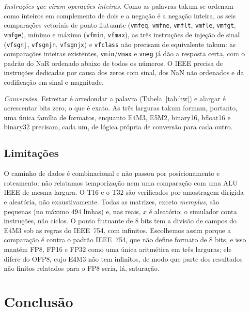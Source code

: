 \documentclass[conference]{IEEEtran}
\newcommand{\code}[1]{\texttt{#1}}
\begin{document}
\emph{Instruções que viram operações inteiras.} Como as palavras takum se ordenam como inteiros em
complemento de dois e a negação é a negação inteira, as seis comparações vetoriais de ponto flutuante
(\code{vmfeq}, \code{vmfne}, \code{vmflt}, \code{vmfle}, \code{vmfgt}, \code{vmfge}), mínimo e máximo
(\code{vfmin}, \code{vfmax}), as três instruções de injeção de sinal (\code{vfsgnj}, \code{vfsgnjn},
\code{vfsgnjx}) e \code{vfclass} não precisam de equivalente takum: as comparações inteiras existentes,
\code{vmin}/\code{vmax} e \code{vneg} já dão a resposta certa, com o padrão do NaR ordenado abaixo de
todos os números. O IEEE precisa de instruções dedicadas por causa dos zeros com sinal, dos NaN não
ordenados e da codificação em sinal e magnitude.

\emph{Conversões.} Estreitar é arredondar a palavra (Tabela~\ref{tab:hw}) e alargar é acrescentar bits
zero, o que é exato. As três larguras takum formam, portanto, uma única família de formatos, enquanto
E4M3, E5M2, binary16, bfloat16 e binary32 precisam, cada um, de lógica própria de conversão para cada
outro.

\subsection{Limitações}

O caminho de dados é combinacional e não passou por posicionamento e roteamento; não relatamos
temporização nem uma comparação com uma ALU IEEE de mesma largura. O T16 e o T32 são verificados por
amostragem dirigida e aleatória, não exaustivamente. Todas as matrizes, exceto \emph{memplus}, são pequenas (no máximo 494 linhas) e, nas
reais, $x$ é aleatório; o simulador conta instruções, não ciclos. O ponto flutuante de 8 bits tem a divisão de campos do E4M3 sob as regras do IEEE~754, com infinitos.
Escolhemos assim porque a comparação é contra o padrão IEEE~754, que não define formato de 8 bits, e isso
mantém FP8, FP16 e FP32 como uma única aritmética em três larguras; ele difere do OFP8, cujo E4M3 não tem
infinitos, de modo que parte dos resultados não finitos relatados para o FP8 seria, lá, saturação.

\section{Conclusão}
\end{document}
